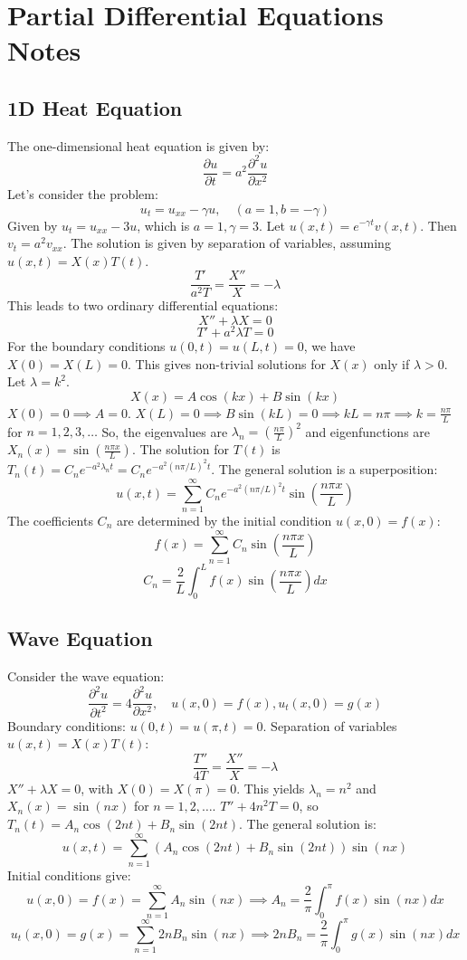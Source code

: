 \documentclass{article}
\begin{document}
	\section*{Partial Differential Equations Notes}
	
	\subsection*{1D Heat Equation}
	The one-dimensional heat equation is given by:
	$$ \frac{\partial u}{\partial t} = a^2 \frac{\partial^2 u}{\partial x^2} $$
	Let's consider the problem:
	$$ u_t = u_{xx} - \gamma u, \quad (a=1, b=-\gamma) $$
	Given by $u_t = u_{xx} - 3u$, which is $a=1, \gamma=3$.
	Let $u(x,t) = e^{-\gamma t} v(x,t)$. Then $v_t = a^2 v_{xx}$.
	The solution is given by separation of variables, assuming $u(x,t) = X(x)T(t)$.
	$$ \frac{T'}{a^2 T} = \frac{X''}{X} = -\lambda $$
	This leads to two ordinary differential equations:
	$$ X'' + \lambda X = 0 $$
	$$ T' + a^2 \lambda T = 0 $$
	For the boundary conditions $u(0,t) = u(L,t) = 0$, we have $X(0)=X(L)=0$.
	This gives non-trivial solutions for $X(x)$ only if $\lambda > 0$. Let $\lambda = k^2$.
	$$ X(x) = A \cos(kx) + B \sin(kx) $$
	$X(0)=0 \implies A=0$.
	$X(L)=0 \implies B \sin(kL)=0 \implies kL = n\pi \implies k = \frac{n\pi}{L}$ for $n=1, 2, 3, \dots$
	So, the eigenvalues are $\lambda_n = (\frac{n\pi}{L})^2$ and eigenfunctions are $X_n(x) = \sin(\frac{n\pi x}{L})$.
	The solution for $T(t)$ is $T_n(t) = C_n e^{-a^2 \lambda_n t} = C_n e^{-a^2 (n\pi/L)^2 t}$.
	The general solution is a superposition:
	$$ u(x,t) = \sum_{n=1}^{\infty} C_n e^{-a^2 (n\pi/L)^2 t} \sin(\frac{n\pi x}{L}) $$
	The coefficients $C_n$ are determined by the initial condition $u(x,0) = f(x)$:
	$$ f(x) = \sum_{n=1}^{\infty} C_n \sin(\frac{n\pi x}{L}) $$
	$$ C_n = \frac{2}{L} \int_0^L f(x) \sin(\frac{n\pi x}{L}) dx $$
	
	\subsection*{Wave Equation}
	Consider the wave equation:
	$$ \frac{\partial^2 u}{\partial t^2} = 4 \frac{\partial^2 u}{\partial x^2}, \quad u(x,0)=f(x), u_t(x,0)=g(x) $$
	Boundary conditions: $u(0,t)=u(\pi,t)=0$.
	Separation of variables $u(x,t) = X(x)T(t)$:
	$$ \frac{T''}{4T} = \frac{X''}{X} = -\lambda $$
	$X''+\lambda X = 0$, with $X(0)=X(\pi)=0$.
	This yields $\lambda_n = n^2$ and $X_n(x) = \sin(nx)$ for $n=1, 2, \dots$.
	$T'' + 4n^2 T = 0$, so $T_n(t) = A_n \cos(2nt) + B_n \sin(2nt)$.
	The general solution is:
	$$ u(x,t) = \sum_{n=1}^{\infty} (A_n \cos(2nt) + B_n \sin(2nt)) \sin(nx) $$
	Initial conditions give:
	$$ u(x,0) = f(x) = \sum_{n=1}^{\infty} A_n \sin(nx) \implies A_n = \frac{2}{\pi} \int_0^\pi f(x)\sin(nx) dx $$
	$$ u_t(x,0) = g(x) = \sum_{n=1}^{\infty} 2n B_n \sin(nx) \implies 2n B_n = \frac{2}{\pi} \int_0^\pi g(x)\sin(nx) dx $$
	
\end{document}
